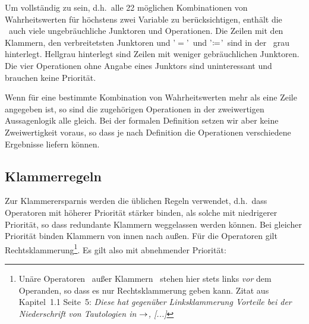 \documentclass[english,ngerman,parskip=half,headsepline,footsepline]{scrreprt}
\makeatletter
\newcommand*{\textdh}{d.\@ h.\@}
\newcommand*{\clq}{'} %
\newcommand*{\crq}{'} %
\makeatother
\begin{document}
	Um vollständig zu sein, \textdh\ alle 22 möglichen Kombinationen von Wahrheitswerten für höchstens zwei Variable zu berücksichtigen, enthält die \tablename\ auch viele ungebräuchliche Junktoren und Operationen. Die Zeilen mit den Klammern, den verbreitetsten Junktoren und \clq$=$\crq\ und \clq$\coloneqq$\crq\ sind in der \tablename\ grau hinterlegt. Hellgrau hinterlegt sind Zeilen mit weniger gebräuchlichen Junktoren. Die vier Operationen ohne Angabe eines Junktors sind uninteressant und brauchen keine Priorität.

	Wenn für eine bestimmte Kombination von Wahrheitswerten mehr als eine Zeile angegeben ist, so sind die zugehörigen Operationen in der zweiwertigen Aussagenlogik alle gleich. Bei der formalen Definition setzen wir aber keine Zweiwertigkeit voraus, so dass je nach Definition die Operationen verschiedene Ergebnisse liefern können.

	\subsection{Klammerregeln} %
	\label{sub:Klammerregeln}

	Zur Klammerersparnis werden die üblichen Regeln verwendet, \textdh\ dass Operatoren mit höherer Priorität stärker binden, als solche mit niedrigerer Priorität, so dass redundante Klammern weggelassen werden können. Bei gleicher Priorität binden Klammern von innen nach außen. Für die Operatoren gilt Rechtsklammerung\footnote{Unäre Operatoren \textendash\ außer Klammern \textendash\ stehen hier stets links \emph{vor} dem Operanden, so dass es nur Rechtsklammerung geben kann. Zitat aus~\cite{bib:Rautenberg} Kapitel~1.1 Seite~5: \emph{Diese hat gegenüber Linksklammerung Vorteile bei der Niederschrift von Tautologien in $\rightarrow$, [...]}}. Es gilt also mit abnehmender Priorität:
\end{document}
